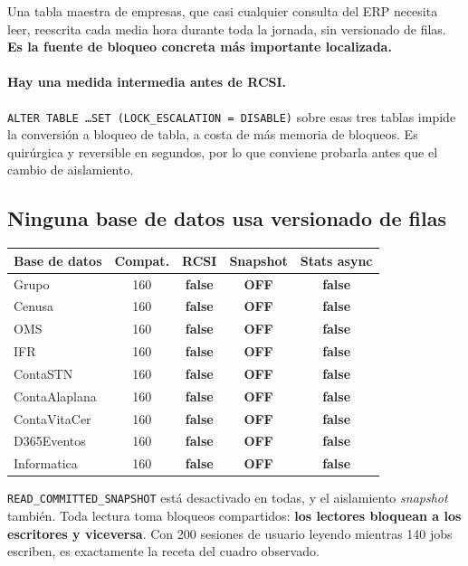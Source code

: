 \documentclass[11pt,a4paper]{article}
\newcommand{\cod}[1]{\texttt{\small #1}}
\newcommand{\critico}[1]{\textcolor{rojo}{\textbf{#1}}}
\begin{document}
Una tabla maestra de empresas, que casi cualquier consulta del ERP necesita
leer, reescrita cada media hora durante toda la jornada, sin versionado de
filas. \textbf{Es la fuente de bloqueo concreta más importante localizada.}

\paragraph{Hay una medida intermedia antes de RCSI.}
\cod{ALTER TABLE \ldots SET (LOCK\_ESCALATION = DISABLE)} sobre esas tres
tablas impide la conversión a bloqueo de tabla, a costa de más memoria de
bloqueos. Es quirúrgica y reversible en segundos, por lo que conviene
probarla antes que el cambio de aislamiento.

\subsection{Ninguna base de datos usa versionado de filas}

\begin{table}[h]
\centering
\small
\begin{tabular}{lcccc}
\toprule
\textbf{Base de datos} & \textbf{Compat.} & \textbf{RCSI} &
\textbf{Snapshot} & \textbf{Stats async} \\
\midrule
Grupo         & 160 & \critico{false} & \critico{OFF} & \critico{false} \\
Cenusa        & 160 & \critico{false} & \critico{OFF} & \critico{false} \\
OMS           & 160 & \critico{false} & \critico{OFF} & \critico{false} \\
IFR           & 160 & \critico{false} & \critico{OFF} & \critico{false} \\
ContaSTN      & 160 & \critico{false} & \critico{OFF} & \critico{false} \\
ContaAlaplana & 160 & \critico{false} & \critico{OFF} & \critico{false} \\
ContaVitaCer  & 160 & \critico{false} & \critico{OFF} & \critico{false} \\
D365Eventos   & 160 & \critico{false} & \critico{OFF} & \critico{false} \\
Informatica   & 160 & \critico{false} & \critico{OFF} & \critico{false} \\
\bottomrule
\end{tabular}
\end{table}

\cod{READ\_COMMITTED\_SNAPSHOT} está desactivado en todas, y el aislamiento
\emph{snapshot} también. Toda lectura toma bloqueos compartidos: \textbf{los
lectores bloquean a los escritores y viceversa}. Con 200 sesiones de usuario
leyendo mientras 140 jobs escriben, es exactamente la receta del cuadro
observado.
\end{document}
